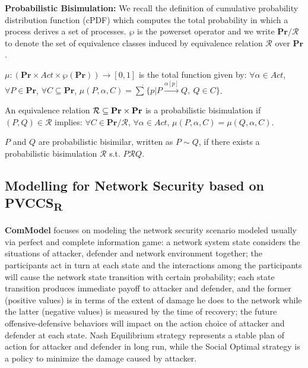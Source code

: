 \documentclass{acm_proc_article-sp}
\begin{document}
\textbf{Probabilistic Bisimulation:}
We recall the definition of \textsf{cumulative probability distribution function} (cPDF) \cite{rob} which computes the total probability in which a process derives a set of processes. $\wp$ is the powerset operator and we write $\mathbf{Pr}/\mathcal{R}$ to denote the set of equivalence classes induced by equivalence relation $\mathcal{R}$ over $\mathbf{Pr}$.
\begin{definition}
$\mu:(\mathbf{Pr}\times Act\times \wp(\mathbf{Pr}))\rightarrow[0,1]$ is the total function given by: $\forall \alpha\in Act$, $\forall P\in \mathbf{Pr}$, $\forall C\subseteq \mathbf{Pr}$, $\mu(P,\alpha,C)=\dot{\sum}\{p|P\stackrel{\alpha[p]}{\longrightarrow}Q,~Q\in C\}$. \end{definition}

\begin{definition}
An equivalence relation $\mathcal{R}\subseteq \begin{bf}Pr\end{bf} \times \begin{bf}Pr\end{bf}$ is a \textsf{probabilistic bisimulation} if $(P, Q)\in \mathcal{R}$ implies: $\forall C\in \mathbf{Pr}/\mathcal{R}$, $\forall\alpha\in Act$, $\mu(P, \alpha, C)=\mu(Q, \alpha, C)$.
\end{definition}
$P$ and $Q$ are probabilistic bisimilar, written as $P\sim Q$, if there exists a probabilistic bisimulation $\mathcal{R}$ s.t. $P\mathcal{R}Q$.

\subsection{Modelling for Network Security based on  PVCCS\textsubscript{R}}
\textbf{ComModel} focuses on modeling the network security scenario modeled usually via perfect and complete information game: a network system state considers the situations of attacker, defender and network environment together; the participants act in turn at each state and the interactions among the participants will cause the network state transition with certain probability; each state transition produces immediate payoff to attacker and defender, and the former (positive values) is in terms of the extent of damage he does to the network while the latter (negative values) is measured by the time of recovery; the future offensive-defensive behaviors will impact on the action choice of attacker and defender at each state. Nash Equilibrium strategy represents a stable plan of action for attacker and defender in long run, while the Social Optimal strategy is a policy to minimize the damage caused by attacker.
\end{document}
